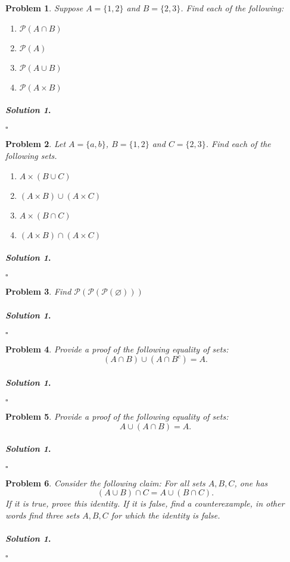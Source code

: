 \documentclass{amsart}
\theoremstyle{plain}
\newtheorem{problem}{Problem}
\newenvironment{solution}{\paragraph{\emph{Solution 1}.}}{\hfill$\square$}
\begin{document}
\begin{problem}
Suppose $A = \{1,2 \}$ and $B = \{ 2,3\}$.  Find each of the following:
\begin{enumerate}
\item $\mathcal{P}(A \cap B)$
\item $\mathcal{P}(A)$
\item $\mathcal{P}(A \cup B)$
\item $\mathcal{P}(A \times B)$
\end{enumerate}
\end{problem}
\begin{solution}
\end{solution}


\begin{problem}
Let $A = \{ a,b\}$, $B  =\{1,2\}$ and $C = \{ 2,3\}$.  Find each of the following sets.
\begin{enumerate}
\item $A \times (B \cup C)$
\item $(A \times B) \cup (A \times C)$
\item $A \times (B \cap C)$
\item $(A \times B) \cap (A \times C)$
\end{enumerate}
\end{problem}
\begin{solution}
\end{solution}

\begin{problem}
Find $\mathcal{P}(\mathcal{P}(\mathcal{P}(\varnothing)))$
\end{problem}
\begin{solution}
\end{solution}

\begin{problem}
Provide a proof of the following equality of sets:
$$(A \cap B) \cup (A \cap B^{c}) = A.$$
\end{problem}
\begin{solution}
\end{solution}

\begin{problem}
Provide a proof of the following equality of sets:
$$A \cup (A \cap B) = A.$$
\end{problem}
\begin{solution}
\end{solution}

\begin{problem}
Consider the following claim:  For all sets $A,B,C$, one has
$$(A \cup B) \cap C = A \cup (B \cap C). $$
If it is true, prove this identity.  If it is false, find a counterexample, in other words find three sets $A,B,C$ for which the identity is false.
\end{problem}
\begin{solution}
\end{solution}
\end{document}
